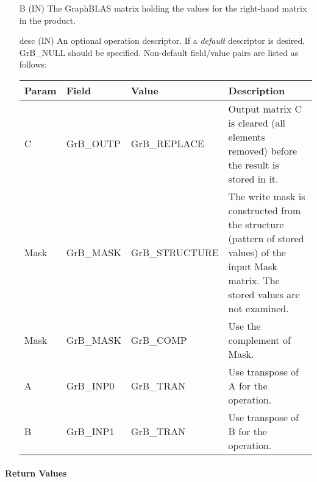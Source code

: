 \begin{itemize}[leftmargin=1.1in]
    \item[{\sf B}]    ({\sf IN}) The GraphBLAS matrix holding the values for
    the right-hand matrix in the product.

    \item[{\sf desc}] ({\sf IN}) An optional operation descriptor. If
    a \emph{default} descriptor is desired, {\sf GrB\_NULL} should be
    specified. Non-default field/value pairs are listed as follows:  \\

    \hspace*{-2em}\begin{tabular}{lllp{2.7in}}
        Param & Field  & Value & Description \\
        \hline
        {\sf C}    & {\sf GrB\_OUTP} & {\sf GrB\_REPLACE} & Output matrix {\sf C}
        is cleared (all elements removed) before the result is stored in it.\\

        {\sf Mask} & {\sf GrB\_MASK} & {\sf GrB\_STRUCTURE}   & The write mask is
        constructed from the structure (pattern of stored values) of the input
        {\sf Mask} matrix. The stored values are not examined.\\

        {\sf Mask} & {\sf GrB\_MASK} & {\sf GrB\_COMP}   & Use the 
        complement of {\sf Mask}. \\

        {\sf A}    & {\sf GrB\_INP0} & {\sf GrB\_TRAN}   & Use transpose of {\sf A}
        for the operation. \\

        {\sf B}    & {\sf GrB\_INP1} & {\sf GrB\_TRAN}   & Use transpose of {\sf B}
        for the operation. \\
    \end{tabular}
\end{itemize}

\paragraph{Return Values}

